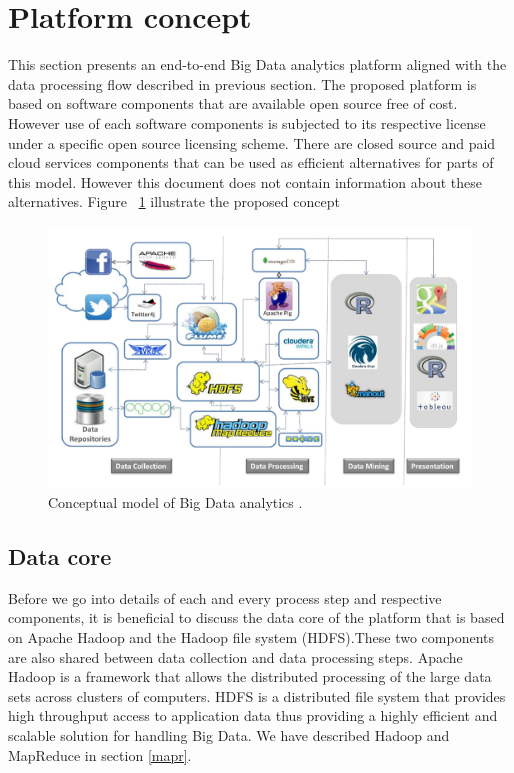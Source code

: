  \section{Platform concept}
 This section presents an end-to-end Big Data analytics platform aligned with the data processing flow described in previous section. The proposed platform is based on software components that are available open source free of cost. However use of each software components is subjected to its respective license under a specific open source licensing scheme. There are closed source and paid cloud services components that can be used as efficient alternatives for parts of this model. However this document does not contain information about these alternatives. Figure ~\ref{fig:cplatform} illustrate the proposed concept
 \begin{figure}[!h]
    \begin{center}
      \includegraphics[width=\textwidth]{images/cplatform.pdf}
      \caption{Conceptual model of Big Data analytics .}
      \label{fig:cplatform}
    \end{center}
  \end{figure} 
\subsection{Data core}
Before we go into details of each and every process step and respective components, it is beneficial to discuss the data core of the platform that is based on Apache Hadoop and the Hadoop file system (HDFS).These two components are also shared between data collection and data processing steps.  Apache Hadoop is a framework that allows the distributed processing of the large data sets across clusters of computers. HDFS is a distributed file system that provides high throughput access to application data\cite{Apachehadoop} thus providing a highly efficient and scalable solution for handling Big Data. We have described Hadoop and MapReduce in section \ref{mapr}.
